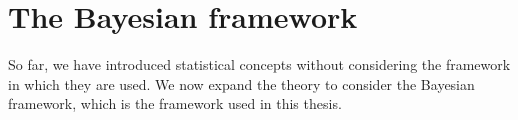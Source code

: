 \section{The Bayesian framework}
So far, we have introduced statistical concepts without considering the framework in which they are used.
We now expand the theory to consider the Bayesian framework, which is the framework used in this thesis.
